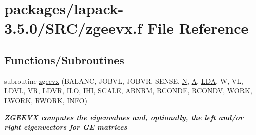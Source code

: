 \hypertarget{zgeevx_8f}{}\section{packages/lapack-\/3.5.0/\+S\+R\+C/zgeevx.f File Reference}
\label{zgeevx_8f}
\subsection*{Functions/\+Subroutines}
\begin{DoxyCompactItemize}
\item 
subroutine \hyperlink{group__complex16GEeigen_gae55acf82651540f7d8f36715eec0900d}{zgeevx} (B\+A\+L\+A\+N\+C, J\+O\+B\+V\+L, J\+O\+B\+V\+R, S\+E\+N\+S\+E, \hyperlink{polmisc_8c_a0240ac851181b84ac374872dc5434ee4}{N}, \hyperlink{classA}{A}, \hyperlink{example__user_8c_ae946da542ce0db94dced19b2ecefd1aa}{L\+D\+A}, W, V\+L, L\+D\+V\+L, V\+R, L\+D\+V\+R, I\+L\+O, I\+H\+I, S\+C\+A\+L\+E, A\+B\+N\+R\+M, R\+C\+O\+N\+D\+E, R\+C\+O\+N\+D\+V, W\+O\+R\+K, L\+W\+O\+R\+K, R\+W\+O\+R\+K, I\+N\+F\+O)
\begin{DoxyCompactList}\small\item\em {\bfseries  Z\+G\+E\+E\+V\+X computes the eigenvalues and, optionally, the left and/or right eigenvectors for G\+E matrices} \end{DoxyCompactList}\end{DoxyCompactItemize}
